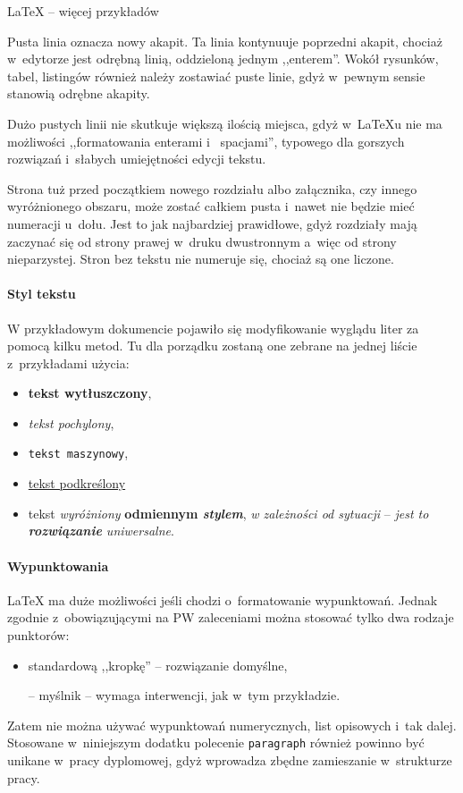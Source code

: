 \begin{easyappendix}{\LaTeX{} -- więcej przykładów}
\label{app:latex}

Pusta linia oznacza nowy akapit.
Ta linia kontynuuje poprzedni akapit, chociaż w~edytorze jest odrębną linią, oddzieloną jednym ,,enterem''. Wokół rysunków, tabel, listingów również należy zostawiać puste linie, gdyż w~pewnym sensie stanowią odrębne akapity.





Dużo pustych linii nie skutkuje większą ilością miejsca, gdyż w~\LaTeX{u} nie ma możliwości ,,formatowania enterami       i~     spacjami'', typowego dla gorszych rozwiązań i~słabych umiejętności edycji tekstu.


Strona tuż przed początkiem nowego rozdziału albo załącznika, czy innego wyróżnionego obszaru, może zostać całkiem pusta i~nawet nie będzie mieć numeracji u~dołu. Jest to jak najbardziej prawidłowe, gdyż rozdziały mają zaczynać się od strony prawej w~druku dwustronnym a~więc od strony nieparzystej. Stron bez tekstu nie numeruje się, chociaż są one liczone.

\paragraph{Styl tekstu}
W przykładowym dokumencie pojawiło się modyfikowanie wyglądu liter za pomocą kilku metod. Tu dla porządku zostaną one zebrane na jednej liście z~przykładami użycia:
\begin{itemize}
	\item \textbf{tekst wytłuszczony},
	\item \textit{tekst pochylony},
	\item \texttt{tekst maszynowy},
	\item \underline{tekst podkreślony}
	\item tekst \emph{wyróżniony} \textbf{odmiennym \emph{stylem}}, \textit{w zależności \emph{od sytuacji}} -- \emph{jest to \textbf{rozwiązanie} \textit{uniwersalne}}.
\end{itemize}

\paragraph{Wypunktowania}
\LaTeX{} ma duże możliwości jeśli chodzi o~formatowanie wypunktowań. Jednak zgodnie z~obowiązującymi na PW zaleceniami można stosować tylko dwa rodzaje punktorów:
\begin{itemize}
	\item standardową ,,kropkę'' -- rozwiązanie domyślne,
	\item[--] myślnik -- wymaga interwencji, jak w~tym przykładzie.
\end{itemize}
Zatem nie można używać wypunktowań numerycznych, list opisowych i~tak dalej. Stosowane w~niniejszym dodatku polecenie \texttt{paragraph} również powinno być unikane w~pracy dyplomowej, gdyż wprowadza zbędne zamieszanie w~strukturze pracy.


\end{easyappendix}
